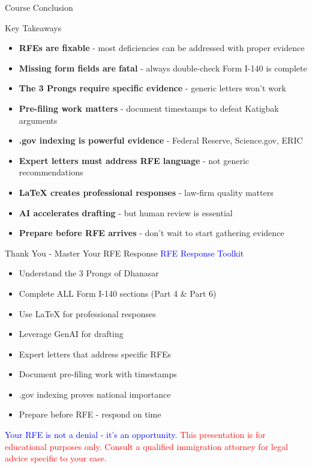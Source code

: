 \documentclass[11pt]{beamer}
\begin{document}
	\begin{frame}{Course Conclusion}
		\scriptsize
		\begin{block}{Key Takeaways}
			\begin{itemize}
				\item \textbf{RFEs are fixable} - most deficiencies can be addressed with proper evidence
				\item \textbf{Missing form fields are fatal} - always double-check Form I-140 is complete
				\item \textbf{The 3 Prongs require specific evidence} - generic letters won't work
				\item \textbf{Pre-filing work matters} - document timestamps to defeat Katigbak arguments
				\item \textbf{.gov indexing is powerful evidence} - Federal Reserve, Science.gov, ERIC
				\item \textbf{Expert letters must address RFE language} - not generic recommendations
				\item \textbf{LaTeX creates professional responses} - law-firm quality matters
				\item \textbf{AI accelerates drafting} - but human review is essential
				\item \textbf{Prepare before RFE arrives} - don't wait to start gathering evidence
			\end{itemize}
		\end{block}
	\end{frame}
	
	\begin{frame}{Thank You - Master Your RFE Response}
		\centering
		\vspace{1cm}
		\textcolor{blue}{\Large RFE Response Toolkit}
		\vspace{0.5cm}
		\begin{itemize}
			\item Understand the 3 Prongs of Dhanasar
			\item Complete ALL Form I-140 sections (Part 4 \& Part 6)
			\item Use LaTeX for professional responses
			\item Leverage GenAI for drafting
			\item Expert letters that address specific RFEs
			\item Document pre-filing work with timestamps
			\item .gov indexing proves national importance
			\item Prepare before RFE - respond on time
		\end{itemize}
		\vspace{0.5cm}
		\textcolor{blue}{\Large Your RFE is not a denial - it's an opportunity.}
		\vspace{0.5cm}
		\textcolor{red}{This presentation is for educational purposes only. Consult a qualified immigration attorney for legal advice specific to your case.}
	\end{frame}
	
\end{document}
